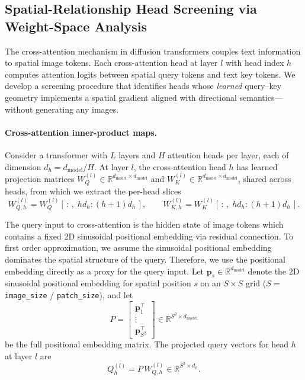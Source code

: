 \documentclass[10pt,twocolumn,letterpaper]{article}
\begin{document}
\clearpage
\subsection{Spatial-Relationship Head Screening via Weight-Space Analysis}\label{method:head_screening}

The cross-attention mechanism in diffusion transformers couples text information to spatial image tokens. Each cross-attention head at layer $l$ with head index $h$ computes attention logits between spatial query tokens and text key tokens. We develop a screening procedure that identifies heads whose \emph{learned} query--key geometry implements a spatial gradient aligned with directional semantics---without generating any images.

\paragraph{Cross-attention inner-product maps.}
Consider a transformer with $L$ layers and $H$ attention heads per layer, each of dimension $d_h = d_{\mathrm{model}} / H$. At layer $l$, the cross-attention head $h$ has learned projection matrices $W_Q^{(l)} \in \mathbb{R}^{d_{\mathrm{model}} \times d_{\mathrm{model}}}$ and $W_K^{(l)} \in \mathbb{R}^{d_{\mathrm{model}} \times d_{\mathrm{model}}}$, shared across heads, from which we extract the per-head slices
\begin{equation}
    W_{Q,h}^{(l)} = W_Q^{(l)}[\,:\,,\; h d_h : (h{+}1)d_h\,], \qquad
    W_{K,h}^{(l)} = W_K^{(l)}[\,:\,,\; h d_h : (h{+}1)d_h\,].
\end{equation}

The query input to cross-attention is the hidden state of image tokens which contains a fixed 2D sinusoidal positional embedding via residual connection. To first order approximation, we assume the sinusoidal positional embedding dominates the spatial structure of the query. Therefore, we use the positional embedding directly as a proxy for the query input. Let $\mathbf{p}_s \in \mathbb{R}^{d_{\mathrm{model}}}$ denote the 2D sinusoidal positional embedding for spatial position $s$ on an $S \times S$ grid ($S = $ \texttt{image\_size} / \texttt{patch\_size}), and let
\begin{equation}
    P = \begin{bmatrix} \mathbf{p}_1^\top \\ \vdots \\ \mathbf{p}_{S^2}^\top \end{bmatrix} \in \mathbb{R}^{S^2 \times d_{\mathrm{model}}}
\end{equation}
be the full positional embedding matrix. The projected query vectors for head $h$ at layer $l$ are
\begin{equation}
    Q_h^{(l)} = P \, W_{Q,h}^{(l)} \in \mathbb{R}^{S^2 \times d_h}.
\end{equation}
\end{document}
